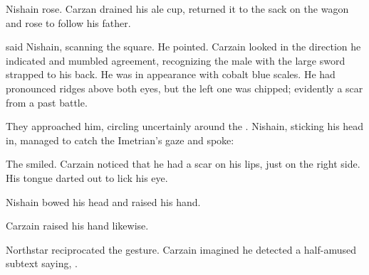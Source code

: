Nishain rose. Carzan drained his ale cup, returned it to the sack on the wagon and rose to follow his father. 


\begin{comment}
\subsubsection{Northstar}
\end{comment}

 said Nishain, scanning the square. He pointed. 
Carzain looked in the direction he indicated and mumbled agreement, recognizing the male \scatha{} with the large sword strapped to his back. 
He was \Tassian{} in appearance with cobalt blue scales. 
He had pronounced ridges above both eyes, but the left one was chipped; evidently a scar from a past battle. 

They approached him, circling uncertainly around the \nycans. 
Nishain, sticking his head in, managed to catch the Imetrian's gaze and spoke: 
\ta{%
  \tongue{%
    Seadri is convaire. \Dai{}vel sei... \IlcasStartRank{} Telcastora?%
  }
}

The \dax{} smiled. 
Carzain noticed that he had a scar on his lips, just on the right side. 
His tongue darted out to lick his eye. 

Nishain bowed his head and raised his hand. 

Carzain raised his hand likewise. 

Northstar reciprocated the gesture. 
Carzain imagined he detected a half-amused subtext saying, . 



